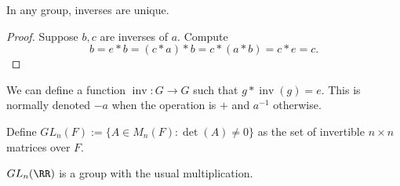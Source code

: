 \begin{prop}
In any group, inverses are unique.
\end{prop}

\begin{proof}
Suppose $b, c$ are inverses of $a$. Compute
\[ b = e * b = (c * a) * b = c * (a * b) = c * e = c. \]
\end{proof}

\begin{cor}
We can define a function $\operatorname{inv} : G \to G$ such that $g *
\operatorname{inv}(g) = e$. This is normally denoted $-a$ when the
operation is $+$ and $a^{-1}$ otherwise.
\end{cor}

\begin{df}
Define $GL_n(F) := \lbrace A \in M_n(F) : \det(A) \neq 0 \rbrace$ as the
set of invertible $n \times n$ matrices over $F$.
\end{df}

\begin{prop}
$GL_n(\RR)$ is a group with the usual multiplication.
\end{prop}
